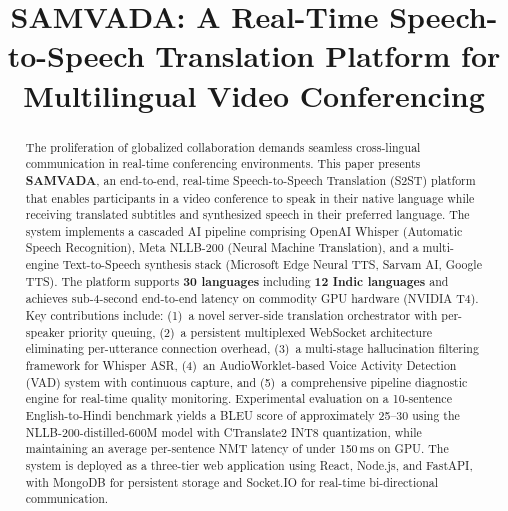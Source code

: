 \documentclass[conference]{IEEEtran}
\begin{document}
\title{SAMVADA: A Real-Time Speech-to-Speech Translation Platform for Multilingual Video Conferencing}

\author{
}

\maketitle

\begin{abstract}
The proliferation of globalized collaboration demands seamless cross-lingual communication in real-time conferencing environments. This paper presents \textbf{SAMVADA}, an end-to-end, real-time Speech-to-Speech Translation (S2ST) platform that enables participants in a video conference to speak in their native language while receiving translated subtitles and synthesized speech in their preferred language. The system implements a cascaded AI pipeline comprising OpenAI Whisper (Automatic Speech Recognition), Meta NLLB-200 (Neural Machine Translation), and a multi-engine Text-to-Speech synthesis stack (Microsoft Edge Neural TTS, Sarvam AI, Google TTS). The platform supports \textbf{30 languages} including \textbf{12 Indic languages} and achieves sub-4-second end-to-end latency on commodity GPU hardware (NVIDIA T4). Key contributions include: (1)~a novel server-side translation orchestrator with per-speaker priority queuing, (2)~a persistent multiplexed WebSocket architecture eliminating per-utterance connection overhead, (3)~a multi-stage hallucination filtering framework for Whisper ASR, (4)~an AudioWorklet-based Voice Activity Detection (VAD) system with continuous capture, and (5)~a comprehensive pipeline diagnostic engine for real-time quality monitoring. Experimental evaluation on a 10-sentence English-to-Hindi benchmark yields a BLEU score of approximately 25--30 using the NLLB-200-distilled-600M model with CTranslate2 INT8 quantization, while maintaining an average per-sentence NMT latency of under 150\,ms on GPU. The system is deployed as a three-tier web application using React, Node.js, and FastAPI, with MongoDB for persistent storage and Socket.IO for real-time bi-directional communication.
\end{abstract}
\end{document}

